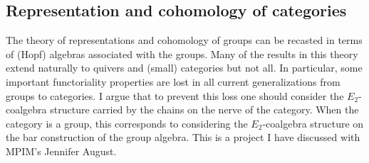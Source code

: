 \documentclass{amsart}
\theoremstyle{definition}
\begin{document}
	\subsection{Representation and cohomology of categories}
	The theory of representations and cohomology of groups can be recasted in terms of (Hopf) algebras associated with the groups. Many of the results in this theory extend naturally to quivers and (small) categories but not all. In particular, some important functoriality properties are lost in all current generalizations from groups to categories.
	I argue that to prevent this loss one should consider the $E_2$-coalgebra structure carried by the chains on the nerve of the category.
	When the category is a group, this corresponds to considering the $E_2$-coalgebra structure on the bar construction of the group algebra.
	This is a project I have discussed with MPIM's Jennifer August.	
	
		
\end{document}
